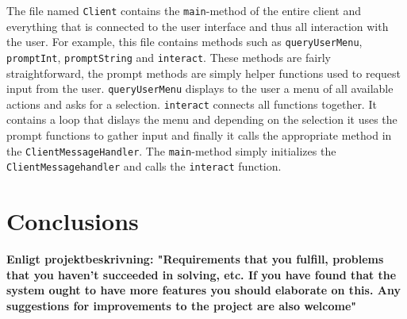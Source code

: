 \documentclass[a4paper]{article}
\begin{document}
The file named \texttt{Client} contains the \texttt{main}-method of the entire client and everything that is connected to the user interface and thus all interaction with the user. For example, this file contains methods such as \texttt{queryUserMenu}, \texttt{promptInt}, \texttt{promptString} and \texttt{interact}. These methods are fairly straightforward, the prompt methods are simply helper functions used to request input from the user. \texttt{queryUserMenu} displays to the user a menu of all available actions and asks for a selection. \texttt{interact} connects all functions together. It contains a loop that dislays the menu and depending on the selection it uses the prompt functions to gather input and finally it calls the appropriate method in the \texttt{ClientMessageHandler}. The \texttt{main}-method simply initializes the \texttt{ClientMessagehandler} and calls the \texttt{interact} function.

\section{Conclusions}

\textbf{Enligt projektbeskrivning:
"Requirements that you fulfill, problems that you haven’t succeeded in solving,
etc. If you have found that the system ought to have more features you should elaborate on
this. Any suggestions for improvements to the project are also welcome"}
\end{document}
